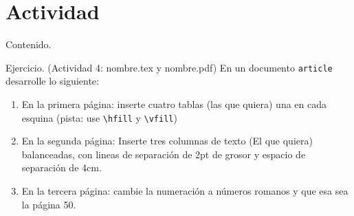 \documentclass[dvipsnames,xcolor, handout]{beamer}
\theoremstyle{plain}
\theoremstyle{definition}
\begin{document}
\section{Actividad} 
\begin{frame}{Contenido.}
  \begin{footnotesize}
\vspace*{-1cm}
\begin{multicols}{2}
  \tableofcontents[currentsection]
\end{multicols}
\end{footnotesize}
\end{frame}
\begin{frame}[fragile]{Ejercicio. (Actividad 4: nombre.tex y nombre.pdf)}
En un documento \verb!article! desarrolle lo siguiente:

\begin{enumerate}
    \item En la primera página: inserte cuatro tablas (las que quiera) una en cada esquina (pista: use \verb!\hfill! y \verb!\vfill!)
    \item En la segunda página: Inserte tres columnas de texto (El que quiera) balanceadas, con lineas de separación de 2pt de grosor y espacio de separación de 4cm. 
    \item En la tercera página: cambie la numeración a números romanos y que esa sea la página 50.
\end{enumerate}

\end{frame}
{
    \begin{frame}
    \vfill
    \begin{center}
    \begin{Huge}
    \end{Huge}
    \end{center}
    \vfill
     \end{frame}
}
            
\end{document}

